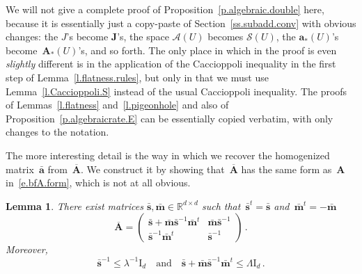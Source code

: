 \documentclass[11pt]{article} %
\numberwithin{equation}{section}
\newtheorem{lemma}[theorem]{Lemma}
\theoremstyle{definition}
\newcommand*{\Id}{\ensuremath{\mathrm{I}_d}}
\newcommand*{\R}{\ensuremath{\mathbb{R}}}
\renewcommand{\a}{\mathbf{a}}
\newcommand{\ahom}{\bar{\a}}
\newcommand{\shom}{\bar{\mathbf{s}}}
\newcommand{\mhom}{\bar{\mathbf{m}}}
\newcommand{\bfA}{\mathbf{A}}
\newcommand{\bfAhom}{\overline{\mathbf{A}}}
\newcommand{\bfJ}{\mathbf{J}}
\begin{document}
We will not give a complete proof of Proposition~\ref{p.algebraic.double} here, because it is essentially just a copy-paste of Section~\ref{ss.subadd.conv} with obvious changes: the $J$'s become $\bfJ$'s, the space $\mathcal{A}(U)$ becomes $\mathcal{S}(U)$, the $\a_*(U)$'s become~$\bfA_*(U)$'s, and so forth. The only place in which in the proof is even \emph{slightly} different is in the application of the Caccioppoli inequality in the first step of Lemma~\ref{l.flatness.rules}, but only in that we must use Lemma~\ref{l.Caccioppoli.S} instead of the usual Caccioppoli inequality.
The proofs of Lemmas~\ref{l.flatness} and~\ref{l.pigeonhole} and also of Proposition~\ref{p.algebraicrate.E} can be essentially copied verbatim, with only changes to the notation.

\smallskip

The more interesting detail is the way in which we recover the homogenized matrix~$\ahom$ from~$\bfAhom$. 
We construct it by showing that~$\bfAhom$ has the same form as~$\bfA$ in~\eqref{e.bfA.form}, which is not at all obvious. 

\begin{lemma} \label{l.untwisting}
There exist matrices $\shom, \mhom \in \R^{d\times d}$ such that~$\shom^t = \shom$ and~$\mhom^t = -\mhom$
\begin{equation}
\label{e.Ahom.amazing}
\bfAhom 
=
\begin{pmatrix} \shom + \mhom\shom^{-1}\mhom^t & \mhom\shom^{-1} \\ \shom^{-1}\mhom^t & \shom^{-1} \end{pmatrix}
\,.
\end{equation}
Moreover,
\begin{equation}
\label{e.shom.mhom.bounds}
\shom^{-1} \leq \lambda^{-1} \Id 
\quad \mbox{and} \quad
\shom + \mhom\shom^{-1}\mhom^t \leq \Lambda \Id
\,.
\end{equation}
\end{lemma}
\end{document}

